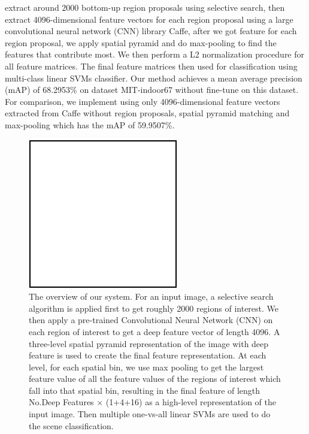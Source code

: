 extract around 2000 bottom-up region
proposals using selective search\cite{Uijlings:2013:SSO}, then extract
4096-dimensional feature vectors for each region proposal using a large
convolutional neural network (CNN) library Caffe\cite{Jia:2014:Caffe},
after we got feature for each region proposal, we apply spatial pyramid and
do max-pooling to find the features that contribute most. We then perform a
L2 normalization procedure for all feature matrices. The final feature matrices
then used for classification using multi-class linear SVMs classifier. Our
method achieves a mean average precision (mAP) of 68.2953\% on dataset
MIT-indoor67\cite{Quattoni:2009:RIS} without fine-tune on this dataset.
For comparison, we implement using only 4096-dimensional feature vectors
extracted from Caffe without region proposals, spatial pyramid matching 
and max-pooling which has the mAP of 59.9507\%.

\begin{figure}[ht]
  \centering
  \includegraphics[scale=0.8]{img/demo.pdf}
  \centering
  \caption{The overview of our system. For an input image, a selective search algorithm is applied first to get roughly 2000 regions of interest. We then apply a pre-trained Convolutional Neural Network (CNN) on each region of interest to get a deep feature vector of length 4096. A three-level spatial pyramid representation of the image with deep feature is used to create the final feature representation. At each level, for each spatial bin, we use max pooling to get the largest feature value of all the feature values of the regions of interest which fall into that spatial bin, resulting in the final feature of length No.Deep Features $\times$ (1+4+16) as a high-level representation of the input image. Then multiple one-vs-all linear SVMs are used to do the scene classification.}
  \label{fig:system_overview}
\end{figure}

